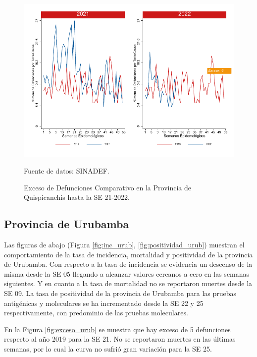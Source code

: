 \documentclass[12pt,a4paper,openany]{book}
\begin{document}
	\begin{figure}[h]
		\caption{Exceso de Defunciones Comparativo en la Provincia de Quispicanchis hasta la SE 21-2022.}\label{fig:exceso_quisp}
		\begin{center}
			\includegraphics[width=0.7\linewidth]{../figuras/exceso_12.pdf}
		\end{center}
		{\footnotesize {Fuente de datos: SINADEF.}}
	\end{figure}
	
	\clearpage
	
	\subsection*{Provincia de Urubamba}
	\noindent Las figuras de abajo (Figura \ref{fig:inc_urub}, \ref{fig:positividad_urub}) muestran el comportamiento de la tasa de incidencia, mortalidad y positividad de la provincia de Urubamba. Con respecto a la tasa de incidencia se evidencia un descenso de la misma desde la SE 05 llegando a alcanzar valores cercanos a cero en las semanas siguientes. Y en cuanto a la tasa de mortalidad no se reportaron muertes desde la SE 09. La tasa de positividad de la provincia de Urubamba para las pruebas antigénicas y moleculares se ha incrementado desde la SE 22 y 25 respectivamente, con predominio de las pruebas moleculares.
	
	En la Figura \ref{fig:exceso_urub} se muestra que hay exceso de 5 defunciones respecto al año 2019 para la SE 21. No se reportaron muertes en las últimas semanas, por lo cual la curva no sufrió gran variación para la SE 25.
	
\end{document}
